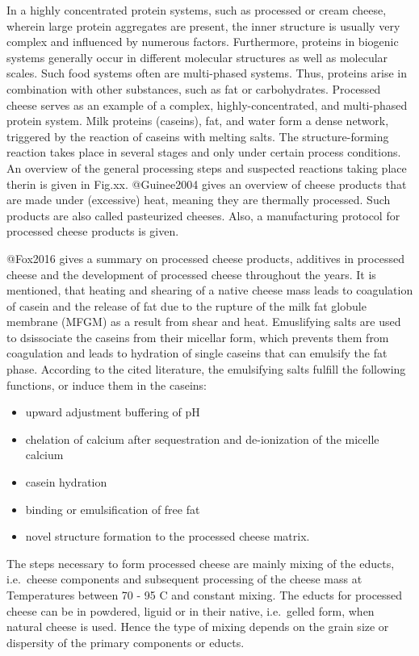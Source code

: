 \documentclass[
]{article}
\providecommand{\tightlist}{%
  \setlength{\itemsep}{0pt}\setlength{\parskip}{0pt}}
\begin{document}
In a highly concentrated protein systems, such as processed or cream
cheese, wherein large protein aggregates are present, the inner
structure is usually very complex and influenced by numerous factors.
Furthermore, proteins in biogenic systems generally occur in different
molecular structures as well as molecular scales. Such food systems
often are multi-phased systems. Thus, proteins arise in combination with
other substances, such as fat or carbohydrates. Processed cheese serves
as an example of a complex, highly-concentrated, and multi-phased
protein system. Milk proteins (caseins), fat, and water form a dense
network, triggered by the reaction of caseins with melting salts. The
structure-forming reaction takes place in several stages and only under
certain process conditions. An overview of the general processing steps
and suspected reactions taking place therin is given in Fig.xx.
@Guinee2004 gives an overview of cheese products that are made under
(excessive) heat, meaning they are thermally processed. Such products
are also called pasteurized cheeses. Also, a manufacturing protocol for
processed cheese products is given.

@Fox2016 gives a summary on processed cheese products, additives in
processed cheese and the development of processed cheese throughout the
years. It is mentioned, that heating and shearing of a native cheese
mass leads to coagulation of casein and the release of fat due to the
rupture of the milk fat globule membrane (MFGM) as a result from shear
and heat. Emuslifying salts are used to dsissociate the caseins from
their micellar form, which prevents them from coagulation and leads to
hydration of single caseins that can emulsify the fat phase. According
to the cited literature, the emulsifying salts fulfill the following
functions, or induce them in the caseins:

\begin{itemize}
\tightlist
\item
  upward adjustment buffering of pH
\item
  chelation of calcium after sequestration and de-ionization of the
  micelle calcium
\item
  casein hydration
\item
  binding or emulsification of free fat
\item
  novel structure formation to the processed cheese matrix.
\end{itemize}

The steps necessary to form processed cheese are mainly mixing of the
educts, i.e.~cheese components and subsequent processing of the cheese
mass at Temperatures between 70 - 95 C and constant mixing. The educts
for processed cheese can be in powdered, liguid or in their native,
i.e.~gelled form, when natural cheese is used. Hence the type of mixing
depends on the grain size or dispersity of the primary components or
educts.
\end{document}
